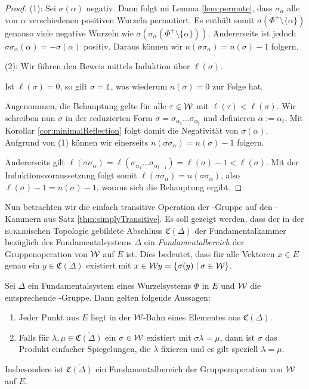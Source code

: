 \begin{proof}
  (1):
  Sei $\sigma(\alpha)$ negativ.
  Dann folgt mi Lemma \ref{lem:permute}, dass $\sigma_\alpha$ alle von $\alpha$ verschiedenen positiven Wurzeln permutiert.
  Es enthält somit $\sigma(\Phi^+ \setminus \{\alpha\})$ genauso viele negative Wurzeln wie $\sigma(\sigma_\alpha(\Phi^+ \setminus \{\alpha\}))$.
  Andererseits ist jedoch $\sigma \sigma_\alpha (\alpha) = -\sigma(\alpha)$ positiv.
  Daraus können wir $n(\sigma\sigma_\alpha) = n(\sigma) - 1$ folgern.

  (2):
  Wir führen den Beweis mittels Induktion über $\ell(\sigma)$.

  Ist $\ell(\sigma)=0$, so gilt $\sigma = \mathds{1}$, was wiederum $n(\sigma)=0$ zur Folge hat.

  Angenommen, die Behauptung gelte für alle $\tau \in \mathcal{W}$ mit $\ell(\tau) < \ell(\sigma)$.
  Wir schreiben nun $\sigma$ in der reduzierten Form $\sigma = \sigma_{\alpha_1} \dots \sigma_{\alpha_t}$ und definieren $\alpha := \alpha_t$.
  Mit Korollar \ref{cor:minimalReflection} folgt damit die Negativität von $\sigma(\alpha)$.
  Aufgrund von (1) können wir einerseits $n(\sigma\sigma_\alpha) = n(\sigma) - 1$ folgern.
  
  Andererseits gilt $\ell(\sigma\sigma_\alpha) = \ell(\sigma_{\alpha_1} \dots \sigma_{\alpha_{t -1}}) = \ell(\sigma) - 1 < \ell(\sigma)$.
  Mit der Induktionsvoraussetzung folgt somit $\ell(\sigma\sigma_\alpha) = n(\sigma\sigma_\alpha)$, also $\ell(\sigma) - 1 = n(\sigma) - 1$, woraus sich die Behauptung ergibt.
\end{proof}

Nun betrachten wir die einfach transitive Operation der \weyl\hyp{}Gruppe auf den \weyl\hyp{}Kammern aus Satz \ref{thm:simplyTransitive}.
Es soll gezeigt werden, dass der in der \textsc{euklid}ischen Topologie gebildete Abschluss $\overline{\mathfrak{C}(\Delta)}$ der Fundamentalkammer bezüglich des Fundamentalsystems $\Delta$ ein \emph{Fundamentalbereich} der Gruppenoperation von $\mathcal{W}$ auf $E$ ist.
Dies bedeutet, dass für alle Vektoren $x \in E$ genau ein $y \in \overline{\mathfrak{C}(\Delta)}$ existiert mit $x \in \mathcal{W} y = \{\sigma(y) \mid \sigma \in \mathcal{W}\}$.

\begin{lem}
  \label{lem:fundamentalDomain}
  Sei $\Delta$ ein Fundamentalsystem eines Wurzelsystems $\Phi$ in $E$ und $\mathcal{W}$ die entsprechende \weyl\hyp{}Gruppe.
  Dann gelten folgende Aussagen:
  \begin{enumerate}[(1)]
    \item Jeder Punkt aus $E$ liegt in der $\mathcal{W}$\hyp{}Bahn eines Elementes aus  $\overline{\mathfrak{C}(\Delta)}$.
    \item Falls für $\lambda, \mu \in \overline{\mathfrak{C}(\Delta)}$ ein $\sigma \in \mathcal{W}$ existiert mit $\sigma \lambda = \mu$, dann ist $\sigma$ das Produkt einfacher Spiegelungen, die $\lambda$ fixieren und es gilt speziell $\lambda = \mu$.
  \end{enumerate}
  Insbesondere ist $\overline{\mathfrak{C}(\Delta)}$ ein Fundamentalbereich der Gruppenoperation von $\mathcal{W}$ auf $E$.
\end{lem}

